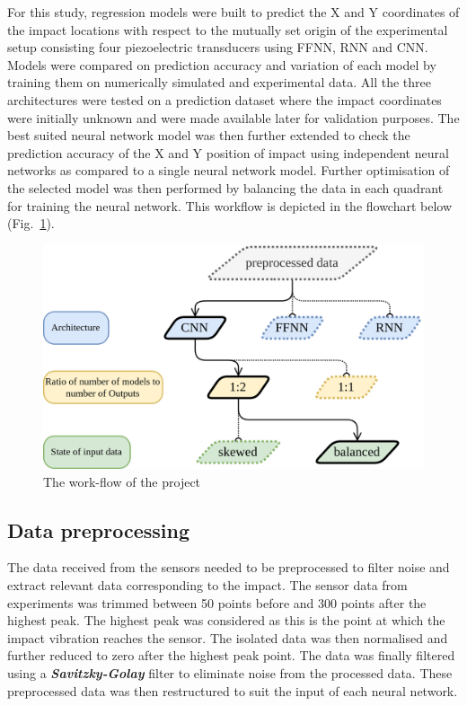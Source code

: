\documentclass[12pt]{article}
\begin{document}
For this study, regression models\cite{6} were built to predict the X and Y coordinates of the impact locations with respect to the mutually set origin of the experimental setup consisting four piezoelectric transducers using FFNN, RNN and CNN. Models were compared on prediction accuracy and variation of each model by training them on numerically simulated and experimental data. All the three architectures were tested on a prediction dataset where the impact coordinates were initially unknown and were made available later for validation purposes. The best suited neural network model was then further extended to check the prediction accuracy of the X and Y position of impact using independent neural networks as compared to a single neural network model. Further optimisation of the selected model was then performed by balancing the data in each quadrant for training the neural network. This workflow is depicted in the flowchart below (Fig.~\ref{flowchart}).
\par
\pagebreak

\begin{figure}[h!]
\begin{center}
\includegraphics[scale=1.2]{Images/Flowchart.png}
\caption{The work-flow of the project}
\label{flowchart}
\end{center}
\end{figure}
\par

\subsection{Data preprocessing} The data received from the sensors needed to be preprocessed to filter noise and extract relevant data corresponding to the impact. The sensor data from experiments was trimmed between 50 points before and 300 points after the highest peak. The highest peak was considered as this is the point at which the impact vibration reaches the sensor. The isolated data was then normalised and further reduced to zero after the highest peak point. The data was finally filtered using a \emph{\textbf{Savitzky-Golay}} filter to eliminate noise from the processed data. These preprocessed data was then restructured to suit the input of each neural network.     
\end{document}
